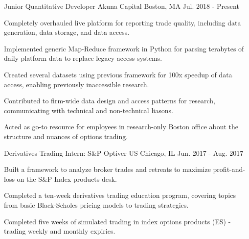 

\begin{cventries}
    \cventry
      {Junior Quantitative Developer} %
      {Akuna Capital} %
      {Boston, MA} %
      {Jul. 2018 - Present} %
      {
        \begin{cvitems} %
          \item {Completely overhauled live platform for reporting trade quality, including data generation, data storage, and data access.}
          \item {Implemented generic Map-Reduce framework in Python for parsing terabytes of daily platform data to replace legacy access systems.}
          \item {Created several datasets using previous framework for 100x speedup of data access, enabling previously inaccessible research.}
          \item {Contributed to firm-wide data design and access patterns for research, communicating with technical and non-technical liasons.}
          \item {Acted as go-to resource for employees in research-only Boston office about the structure and nuances of options trading.}
        \end{cvitems}
      }
    \cventry
      {Derivatives Trading Intern: S\&P} %
      {Optiver US} %
      {Chicago, IL} %
      {Jun. 2017 - Aug. 2017} %
      {
        \begin{cvitems} %
          \item {Built a framework to analyze broker trades and retreats to maximize profit-and-loss on the S\&P Index products desk.}
          \item {Completed a ten-week derivatives trading education program, covering topics from basic Black-Scholes pricing models to trading strategies.}
          \item {Completed five weeks of simulated trading in index options products (ES) - trading weekly and monthly expiries.}

\end{cvitems}}
\end{cventries}
